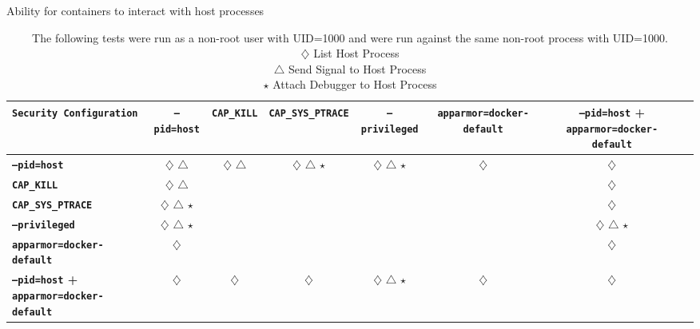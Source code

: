 \FloatBarrier
{\captionsetup{font=footnotesize}
\begin{table}[h]  
    \centering
    \footnotesize  
    \setlength{\tabcolsep}{4pt}  
    \renewcommand{\arraystretch}{1.1}  
    \caption{Ability for containers to interact with host processes}
    \label{tab:pid-namespace-security}  
    \begin{adjustbox}{max width=\textwidth}  
    \begin{tabular}{|l|c|c|c|c|c|c|c|}
        \hline
        \textbf{\texttt{Security Configuration}} & \textbf{\texttt{--pid=host}} & \textbf{\texttt{CAP\_KILL}} & \textbf{\texttt{CAP\_SYS\_PTRACE}} & \textbf{\texttt{--privileged}} & \textbf{\texttt{apparmor=docker-default}} & \textbf{\texttt{--pid=host} + \texttt{apparmor=docker-default}}  \\ \hline
        
        \textbf{\texttt{--pid=host}} & $\diamondsuit$ $\triangle$ & $\diamondsuit$ $\triangle$  & $\diamondsuit$ $\triangle$ $\star$  & $\diamondsuit$ $\triangle$ $\star$ & $\diamondsuit$ & $\diamondsuit$  \\ \hline
        
        \textbf{\texttt{CAP\_KILL}} & $\diamondsuit$ $\triangle$  & & & & & $\diamondsuit$  \\ \hline
        
        \textbf{\texttt{CAP\_SYS\_PTRACE}} & $\diamondsuit$ $\triangle$ $\star$  & & & & & $\diamondsuit$  \\ \hline
        
        \textbf{\texttt{--privileged}} & $\diamondsuit$ $\triangle$ $\star$ & & & & & $\diamondsuit$ $\triangle$ $\star$  \\ \hline

        \textbf{\texttt{apparmor=docker-default}} & $\diamondsuit$ &  & & & & $\diamondsuit$ \\ \hline 
                
        \textbf{\texttt{--pid=host} + \texttt{apparmor=docker-default}} & $\diamondsuit$ & $\diamondsuit$  & $\diamondsuit$  & $\diamondsuit$ $\triangle$ $\star$ & $\diamondsuit$ & $\diamondsuit$  \\ \hline 
    \end{tabular}  
    \end{adjustbox}
    \caption*{
        The following tests were run as a non-root user with UID=1000 and were run against the same non-root process with UID=1000. \\
        $\diamondsuit$ List Host Process \quad \\
        $\triangle$ Send Signal to Host Process \quad \\
        $\star$ Attach Debugger to Host Process
    }
\end{table}





















}
